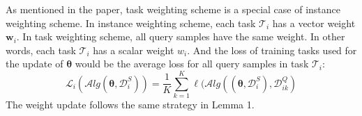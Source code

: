 As mentioned in the paper, task weighting scheme is a special case of instance weighting scheme. In instance weighting scheme, each task $\mathcal{T}_i$ has a vector weight $\mathbf{w}_i$. In task weighting scheme, all query samples have the same weight. In other words, each task $\mathcal{T}_i$ has a scalar weight $w_i$. And the loss of training tasks used for the update of $\boldsymbol{\theta}$ would be the average loss for all query samples in task $\mathcal{T}_i$:
$$
\mathcal{L}_i(\mathcal{A}lg(\boldsymbol{\theta},\mathcal{D}_i^{S})) = \frac{1}{K} \sum_{k=1}^{K} \ell(\mathcal{A}lg((\boldsymbol{\theta}, \mathcal{D}_{i}^{S}), \mathcal{D}_{ik}^{Q})
$$
The weight update follows the same strategy in Lemma 1.

